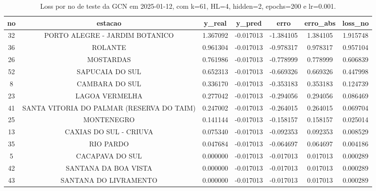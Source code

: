 \begin{table}[h]
\centering
\caption{Loss por no de teste da GCN em 2025-01-12, com k=61, HL=4, hidden=2, epochs=200 e lr=0.001.}
\label{tab:gcn_loss_k61_hl4_h2_e200_d20250112}
\begin{tabular}{ccccccc}
\toprule
no & estacao & y\_real & y\_pred & erro & erro\_abs & loss\_no \\
\midrule
32 & PORTO ALEGRE - JARDIM BOTANICO & 1.367092 & -0.017013 & -1.384105 & 1.384105 & 1.915748 \\
36 & ROLANTE & 0.961304 & -0.017013 & -0.978317 & 0.978317 & 0.957104 \\
26 & MOSTARDAS & 0.761986 & -0.017013 & -0.778999 & 0.778999 & 0.606839 \\
52 & SAPUCAIA DO SUL & 0.652313 & -0.017013 & -0.669326 & 0.669326 & 0.447998 \\
8 & CAMBARA DO SUL & 0.336170 & -0.017013 & -0.353183 & 0.353183 & 0.124739 \\
23 & LAGOA VERMELHA & 0.277042 & -0.017013 & -0.294056 & 0.294056 & 0.086469 \\
41 & SANTA VITORIA DO PALMAR (RESERVA DO TAIM) & 0.247002 & -0.017013 & -0.264015 & 0.264015 & 0.069704 \\
25 & MONTENEGRO & 0.141144 & -0.017013 & -0.158157 & 0.158157 & 0.025014 \\
13 & CAXIAS DO SUL - CRIUVA & 0.075340 & -0.017013 & -0.092353 & 0.092353 & 0.008529 \\
35 & RIO PARDO & 0.047684 & -0.017013 & -0.064697 & 0.064697 & 0.004186 \\
5 & CACAPAVA DO SUL & 0.000000 & -0.017013 & -0.017013 & 0.017013 & 0.000289 \\
42 & SANTANA DA BOA VISTA & 0.000000 & -0.017013 & -0.017013 & 0.017013 & 0.000289 \\
43 & SANTANA DO LIVRAMENTO & 0.000000 & -0.017013 & -0.017013 & 0.017013 & 0.000289 \\
\bottomrule
\end{tabular}
\end{table}
